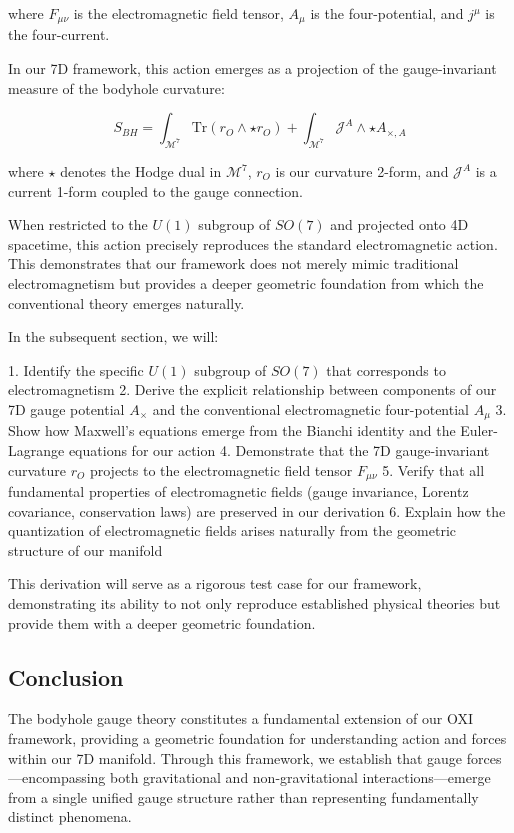 \documentclass{article}
\begin{document}
where $F_{\mu\nu}$ is the electromagnetic field tensor, $A_\mu$ is the four-potential, and $j^\mu$ is the four-current.

In our 7D framework, this action emerges as a projection of the gauge-invariant measure of the bodyhole curvature:

\begin{equation}
S_{BH} = \int_{\mathcal{M}^7} \text{Tr}(r_O \wedge \star r_O) + \int_{\mathcal{M}^7} \mathcal{J}^A \wedge \star A_{\times,A}
\end{equation}

where $\star$ denotes the Hodge dual in $\mathcal{M}^7$, $r_O$ is our curvature 2-form, and $\mathcal{J}^A$ is a current 1-form coupled to the gauge connection.

When restricted to the $U(1)$ subgroup of $SO(7)$ and projected onto 4D spacetime, this action precisely reproduces the standard electromagnetic action. This demonstrates that our framework does not merely mimic traditional electromagnetism but provides a deeper geometric foundation from which the conventional theory emerges naturally.

In the subsequent section, we will:

1. Identify the specific $U(1)$ subgroup of $SO(7)$ that corresponds to electromagnetism
2. Derive the explicit relationship between components of our 7D gauge potential $A_{\times}$ and the conventional electromagnetic four-potential $A_\mu$
3. Show how Maxwell's equations emerge from the Bianchi identity and the Euler-Lagrange equations for our action
4. Demonstrate that the 7D gauge-invariant curvature $r_O$ projects to the electromagnetic field tensor $F_{\mu\nu}$
5. Verify that all fundamental properties of electromagnetic fields (gauge invariance, Lorentz covariance, conservation laws) are preserved in our derivation
6. Explain how the quantization of electromagnetic fields arises naturally from the geometric structure of our manifold

This derivation will serve as a rigorous test case for our framework, demonstrating its ability to not only reproduce established physical theories but provide them with a deeper geometric foundation.

\subsection{Conclusion}

The bodyhole gauge theory constitutes a fundamental extension of our OXI framework, providing a geometric foundation for understanding action and forces within our 7D manifold. Through this framework, we establish that gauge forces—encompassing both gravitational and non-gravitational interactions—emerge from a single unified gauge structure rather than representing fundamentally distinct phenomena.
\end{document}
